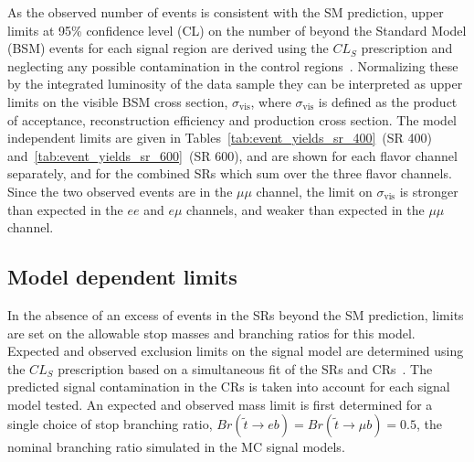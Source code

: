 As the observed number of events is consistent with the SM
prediction, upper limits at 95\% confidence level (CL) on the number of
beyond the Standard Model (BSM) events for each signal region are derived
using the $CL_S$ prescription and neglecting any possible contamination in the
control regions~\cite{Baak:2014wma}.
Normalizing these by the integrated luminosity of the data sample they can be
interpreted as upper limits on the visible BSM cross section,
$\sigma_\mathrm{vis}$, where $\sigma_\mathrm{vis}$ is defined as the product of
acceptance, reconstruction efficiency and production cross section.
The model independent limits are given in
Tables~\ref{tab:event_yields_sr_400}~(SR 400)
and~\ref{tab:event_yields_sr_600}~(SR 600), and are shown for each flavor
channel separately, and for the combined SRs which sum over the three flavor
channels.
Since the two observed events are in the $\mu\mu$ channel, the limit on
$\sigma_\mathrm{vis}$ is stronger than expected in the $ee$ and $e\mu$
channels, and weaker than expected in the $\mu\mu$ channel.

\FloatBarrier
\subsection{Model dependent limits}
\label{sec:model_dependent_limits}

In the absence of an excess of events in the SRs beyond the SM prediction,
limits are set on the allowable stop masses and branching ratios for this model.
Expected and observed exclusion limits on the signal model are determined using
the $CL_S$ prescription based on a simultaneous fit of the SRs and
CRs~\cite{Baak:2014wma}.
The predicted signal contamination in the CRs is taken into account for each
signal model tested.
An expected and observed mass limit is first determined for a single choice of
stop branching ratio, $Br(\tilde{t} \to eb) = Br(\tilde{t} \to \mu b) = 0.5$,
the nominal branching ratio simulated in the MC signal models.


